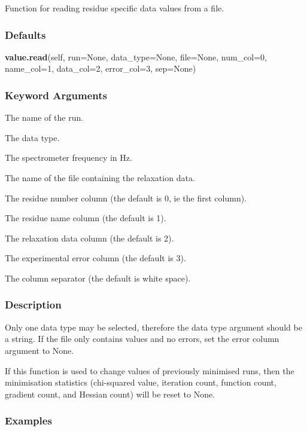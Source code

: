Function for reading residue specific data values from a file.

\subsubsection{Defaults}

\textsf{\textbf{value.read}(self, run=None, data\_type=None, file=None, num\_col=0, name\_col=1, data\_col=2, error\_col=3, sep=None)}


\subsubsection{Keyword Arguments}


  The name of the run.

  The data type.

  The spectrometer frequency in Hz.

  The name of the file containing the relaxation  data.

  The residue number column (the default is 0, ie the first column).

  The residue name column (the default is 1).

  The relaxation  data column (the default is 2).

  The experimental error column (the default is 3).

  The column separator (the default is white space).

\subsubsection{Description}

Only one data type may be selected, therefore the data type argument should be a string.  If
the file only contains values and no errors, set the error column argument to None.

If this function is used to change values of previously minimised  runs, then the
minimisation  statistics (chi-squared value, iteration count, function count, gradient count,
and Hessian count) will be reset to None.


\subsubsection{Examples}

